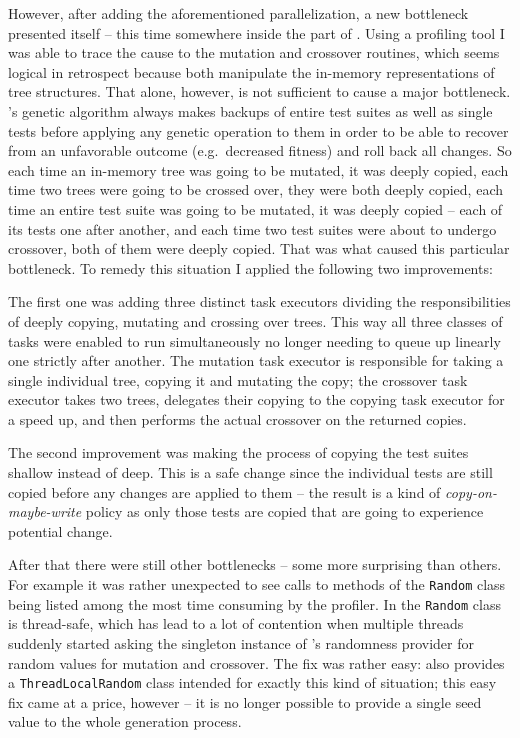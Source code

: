 However, after adding the aforementioned parallelization, a new bottleneck presented itself -- this time 
somewhere inside the \java part of \xmlmate. Using a \java profiling tool I was able to trace the cause 
to the mutation and crossover routines, which seems logical in retrospect because both manipulate the 
in-memory representations of \xml tree structures. That alone, however, is not sufficient to cause a 
major bottleneck. \evosuite's genetic algorithm always makes backups of entire test suites as well as 
single tests before applying any genetic operation to them in order to be able to recover from an 
unfavorable outcome (e.g.\ decreased fitness) and roll back all changes. So each time an in-memory \xml 
tree was going to be mutated, it was deeply copied, each time two \xml trees were going to be crossed 
over, they were both deeply copied, each time an entire test suite was going to be mutated, it was 
deeply copied -- each of its tests one after another, and each time two test suites were about to 
undergo crossover, both of them were deeply copied. That was what caused this particular bottleneck. 
To remedy this situation I applied the following two improvements:

The first one was adding three distinct task executors dividing the responsibilities of deeply copying, mutating and 
crossing over \xml trees. This way all three classes of tasks were enabled to run simultaneously 
no longer needing to queue up linearly one strictly after another. The mutation task executor is 
responsible for taking a single individual \xml tree, copying it and mutating the copy; the 
crossover task executor takes two \xml trees, delegates their copying to the copying task executor 
for a speed up, and then performs the actual crossover on the returned copies.

The second improvement was making the process of copying the test suites shallow instead of deep. 
This is a safe change since the individual tests are still copied before any changes are applied 
to them -- the result is a kind of \emph{copy-on-maybe-write} policy as only those tests are copied 
that are going to experience potential change.

After that there were still other bottlenecks -- some more surprising than others. For example 
it was rather unexpected to see calls to methods of the \texttt{Random} class being listed among the most time
consuming by the profiler. In  the \texttt{Random} class is thread-safe, which has lead to a lot of 
contention when multiple threads suddenly started asking the singleton instance of \evosuite's randomness 
provider for random values for mutation and crossover. The fix was rather easy:  also provides 
a \texttt{ThreadLocalRandom} class intended for exactly this kind of situation; this easy fix came 
at a price, however -- it is no longer possible to provide a single seed value to the whole generation 
process.

